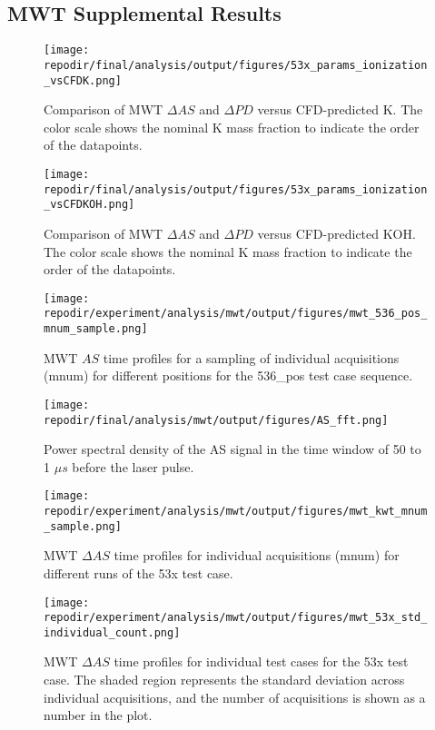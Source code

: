 \subsection{MWT Supplemental Results}

\begin{figure}[h]
    \centering
    \texttt{[image: \\repodir/final/analysis/output/figures/53x\_params\_ionization\_vsCFDK.png]} 
    \caption{Comparison of MWT $\Delta AS$ and $\Delta PD$ versus CFD-predicted K. The color scale shows the nominal K mass fraction to indicate the order of the datapoints.}
    \label{fig:SI_53x_params_ionization_vsCFDK}
\end{figure}

\begin{figure}[h]
    \centering
    \texttt{[image: \\repodir/final/analysis/output/figures/53x\_params\_ionization\_vsCFDKOH.png]} 
    \caption{Comparison of MWT $\Delta AS$ and $\Delta PD$ versus CFD-predicted KOH. The color scale shows the nominal K mass fraction to indicate the order of the datapoints.}
    \label{fig:SI_53x_params_ionization_vsCFDKOH}
\end{figure}



\begin{figure}[]
\centering
\texttt{[image: \\repodir/experiment/analysis/mwt/output/figures/mwt\_536\_pos\_mnum\_sample.png]}
\caption{MWT $AS$ time profiles for a sampling of individual acquisitions (mnum) for different positions for the 536\_pos test case sequence.}
\label{fig:SI_mwt_536_pos_mnum_sample}
\end{figure}

\begin{figure}
    \centering
    \texttt{[image: \\repodir/final/analysis/mwt/output/figures/AS\_fft.png]} 
    \caption{Power spectral density of the AS signal in the time window of 50 to 1 $\mu s$ before the laser pulse.}
    \label{fig:SI_AS_fft}
\end{figure}

\begin{figure}
    \centering
    \texttt{[image: \\repodir/experiment/analysis/mwt/output/figures/mwt\_kwt\_mnum\_sample.png]} 
    \caption{MWT $\Delta AS$ time profiles for individual acquisitions (mnum) for different runs of the 53x test case.  }
    \label{fig:SI_mwt_kwt_mnum_sample}
\end{figure}

\begin{figure}
    \centering
    \texttt{[image: \\repodir/experiment/analysis/mwt/output/figures/mwt\_53x\_std\_individual\_count.png]} 
    \caption{MWT $\Delta AS$ time profiles for individual test cases for the 53x test case. The shaded region represents the standard deviation across individual acquisitions, and the number of acquisitions is shown as a number in the plot.}
    \label{fig:SI_mwt_53x_std_individual_count}
\end{figure}

